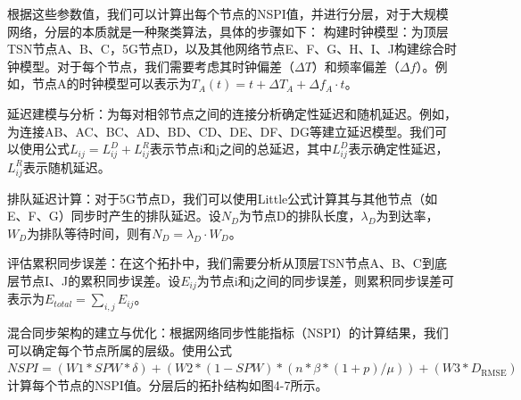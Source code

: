\documentclass[UTF8,a4paper,12pt]{ctexart}
\numberwithin{equation}{section}
\begin{document}
根据这些参数值，我们可以计算出每个节点的NSPI值，并进行分层，对于大规模网络，分层的本质就是一种聚类算法，具体的步骤如下：
构建时钟模型：为顶层TSN节点A、B、C，5G节点D，以及其他网络节点E、F、G、H、I、J构建综合时钟模型。对于每个节点，我们需要考虑其时钟偏差（$\Delta T$）和频率偏差（$\Delta f$）。例如，节点A的时钟模型可以表示为$T_A(t) = t + \Delta T_A + \Delta f_A \cdot t$。

延迟建模与分析：为每对相邻节点之间的连接分析确定性延迟和随机延迟。例如，为连接AB、AC、BC、AD、BD、CD、DE、DF、DG等建立延迟模型。我们可以使用公式$L_{ij} = L_{ij}^D + L_{ij}^R$表示节点i和j之间的总延迟，其中$L_{ij}^D$表示确定性延迟，$L_{ij}^R$表示随机延迟。

排队延迟计算：对于5G节点D，我们可以使用Little公式计算其与其他节点（如E、F、G）同步时产生的排队延迟。设$N_D$为节点D的排队长度，$\lambda_D$为到达率，$W_D$为排队等待时间，则有$N_D = \lambda_D \cdot W_D$。

评估累积同步误差：在这个拓扑中，我们需要分析从顶层TSN节点A、B、C到底层节点I、J的累积同步误差。设$E_{ij}$为节点i和j之间的同步误差，则累积同步误差可表示为$E_{total} = \sum_{i,j} E_{ij}$。

混合同步架构的建立与优化：根据网络同步性能指标（NSPI）的计算结果，我们可以确定每个节点所属的层级。使用公式$NSPI = (W1 * SPW * \delta) + (W2 * (1 - SPW) * (n * \beta * (1 + p) / \mu)) + (W3 * D_{\text{RMSE}})$计算每个节点的NSPI值。分层后的拓扑结构如图4-7所示。
\end{document}

